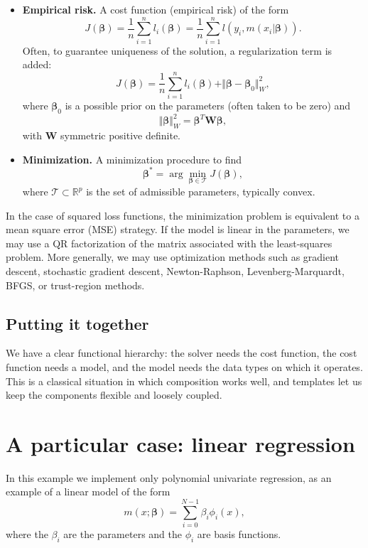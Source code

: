 \documentclass{article}
\begin{document}
\begin{itemize}
  \item \textbf{Empirical risk.} A cost function (empirical risk) of the form
  \begin{equation}\label{eq:empiricalr}
    J(\boldsymbol{\beta})=\frac{1}{n}\sum_{i=1}^{n} l_i(\boldsymbol{\beta})=\frac{1}{n}\sum_{i=1}^{n}l(y_i,m(x_i|\boldsymbol{\beta})).
  \end{equation}
  Often, to guarantee uniqueness of the solution, a regularization term is added:
  \begin{equation}\label{eq:empiricalrreg}
    J(\boldsymbol{\beta})=\frac{1}{n}\sum_{i=1}^{n} l_i(\boldsymbol{\beta})+\Vert\boldsymbol{\beta}-\boldsymbol{\beta}_0\Vert^2_W,
  \end{equation}
  where $\boldsymbol{\beta}_0$ is a possible prior on the parameters (often taken to be zero) and
  \[
    \Vert\boldsymbol{\beta}\Vert^2_W=\boldsymbol{\beta}^T \mathbf{W} \boldsymbol{\beta},
  \]
  with $\mathbf{W}$ symmetric positive definite.
  \item \textbf{Minimization.} A minimization procedure to find
  \begin{equation}\label{eq:minim}
    \boldsymbol{\beta}^*=\arg\min_{\boldsymbol{\beta}\in \mathcal{T}}J(\boldsymbol{\beta}),
  \end{equation}
  where $\mathcal{T}\subset\mathbb{R}^p$ is the set of admissible parameters, typically convex.
\end{itemize}

In the case of squared loss functions, the minimization problem is equivalent to a mean square error (MSE) strategy. If the model is linear in the parameters, we may use a QR factorization of the matrix associated with the least-squares problem. More generally, we may use optimization methods such as gradient descent, stochastic gradient descent, Newton-Raphson, Levenberg-Marquardt, BFGS, or trust-region methods.

\subsection{Putting it together}
We have a clear functional hierarchy: the solver needs the cost function, the cost function needs a model, and the model needs the data types on which it operates. This is a classical situation in which composition works well, and templates let us keep the components flexible and loosely coupled.

\section{A particular case: linear regression}
In this example we implement only polynomial univariate regression, as an example of a linear model of the form
\begin{equation}
  m(x;\boldsymbol{\beta})=\sum_{i=0}^{N-1} \beta_i\phi_i(x),
\end{equation}
where the $\beta_i$ are the parameters and the $\phi_i$ are basis functions.
\end{document}
